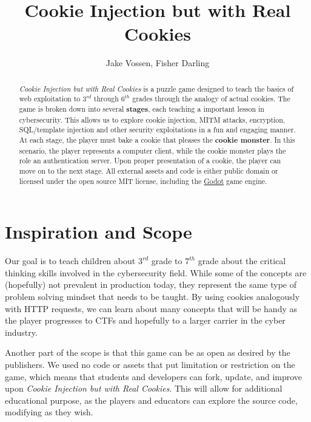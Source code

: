 \documentclass{article}
\begin{document}
\title{Cookie Injection but with Real Cookies}
\author{Jake Vossen, Fisher Darling}

\maketitle

\begin{abstract}
  
\textit{Cookie Injection but with Real Cookies} is a puzzle game
designed to teach the basics of web exploitation to $3^{rd}$ through
$6^{th}$ grades through the analogy of actual cookies. The game is
broken down into several \textbf{stages}, each teaching a important
lesson in cybersecurity. This allows us to explore cookie injection,
MITM attacks, encryption, SQL/template injection and other security
exploitations in a fun and engaging manner. At each stage, the player must bake a cookie that pleases the \textbf{cookie monster}. In this scenario, the player
represents a computer client, while the cookie monster plays the role
an authentication server. Upon proper presentation of a cookie, the
player can move on to the next stage. All external assets and code is
either public domain or licensed under the open source MIT
license, including the \href{https://godotengine.org}{Godot} game
engine.



\end{abstract}

\section{Inspiration and Scope}

Our goal is to teach children about $3^{rd}$ grade to $7^{th}$ grade
about the critical thinking skills involved in the cybersecurity
field. While some of the concepts are (hopefully) not prevalent in
production today, they represent the same type of problem solving
mindset that needs to be taught. By using cookies analogously with
HTTP requests, we can learn about many concepts that will be handy as
the player progresses to CTFs and hopefully to a larger carrier in the
cyber industry.

Another part of the scope is that this game can be as open as desired
by the publishers. We used no code or assets that put limitation or
restriction on the game, which means that students and developers can
fork, update, and improve upon \textit{Cookie Injection but with Real
Cookies}. This will allow for additional educational purpose, as the players
and educators can explore the source code, modifying as they wish.
\end{document}
